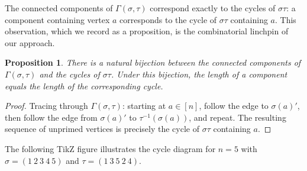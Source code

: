 \documentclass[12pt,a4paper]{article}
\newtheorem{proposition}[theorem]{Proposition}
\theoremstyle{definition}
\begin{document}
\noindent
The connected components of $\Gamma(\sigma,\tau)$ correspond exactly
to the cycles of $\sigma\tau$: a component containing vertex $a$
corresponds to the cycle of $\sigma\tau$ containing $a$.  This
observation, which we record as a proposition, is the combinatorial
linchpin of our approach.

\begin{proposition}
\label{prop:cycle_diagram}
There is a natural bijection between the connected components of
$\Gamma(\sigma,\tau)$ and the cycles of $\sigma\tau$.  Under this
bijection, the length of a component equals the length of the
corresponding cycle.
\end{proposition}

\begin{proof}
Tracing through $\Gamma(\sigma,\tau)$: starting at $a\in[n]$, follow
the edge to $\sigma(a)'$, then follow the edge from $\sigma(a)'$ to
$\tau^{-1}(\sigma(a))$, and repeat.  The resulting sequence of
unprimed vertices is precisely the cycle of $\sigma\tau$ containing $a$.
\end{proof}

The following TikZ figure illustrates the cycle diagram for $n=5$ with
$\sigma=(1\ 2\ 3\ 4\ 5)$ and $\tau=(1\ 3\ 5\ 2\ 4)$.

\begin{center}
\end{center}
\end{document}
